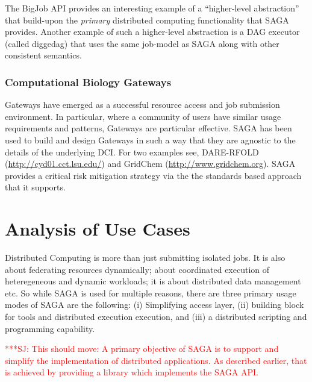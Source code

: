 \documentclass[12pt]{article}
\newcommand{\jhanote}[1]{ {\textcolor{red}     {***SJ: #1}}}
\newcommand{\jhanote}[1]{}
\begin{document}
The BigJob API provides an interesting example of a ``higher-level
abstraction'' that build-upon the {\it primary} distributed computing
functionality that SAGA provides. Another example of such a
higher-level abstraction is a DAG executor (called diggedag) that uses
the same job-model as SAGA along with other consistent semantics.

\subsubsection*{Computational Biology Gateways}

Gateways have emerged as a successful resource access and job
submission environment.  In particular, where a community of users
have similar usage requirements and patterns, Gateways are particular
effective.  SAGA has been used to build and design Gateways in such a
way that they are agnostic to the details of the underlying DCI. For
two examples see, DARE-RFOLD (\url{http://cyd01.cct.lsu.edu/}) and
GridChem (\url{http://www.gridchem.org}).  SAGA provides a critical
risk mitigation strategy via the the standards based approach that it
supports.

\section{Analysis of Use Cases}

Distributed Computing is more than just submitting isolated jobs.  It
is also about federating resources dynamically; about coordinated
execution of heteregeneous and dynamic workloads; it is about
distributed data management etc. So while SAGA is used for multiple
reasons, there are three primary usage modes of SAGA are the
following: (i) Simplifying access layer, (ii) building block for tools
and distributed execution execution, and (iii) a distributed scripting
and programming capability.


\jhanote{This should move: A primary objective of SAGA is to support
  and simplify the implementation of distributed applications.  As
  described earlier, that is achieved by providing a library which
  implements the SAGA API.}

\end{document}
